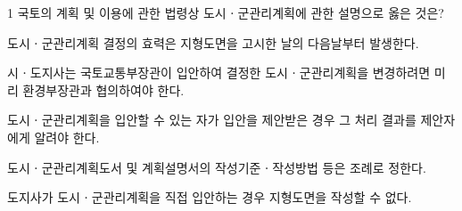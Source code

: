 \begin{question}{1}
국토의 계획 및 이용에 관한 법령상 도시ㆍ군관리계획에 관한 설명으로 옳은 것은?
\begin{choices}
  \item 도시ㆍ군관리계획 결정의 효력은 지형도면을 고시한 날의 다음날부터 발생한다.
  \item 시ㆍ도지사는 국토교통부장관이 입안하여 결정한 도시ㆍ군관리계획을 변경하려면 미리 환경부장관과 협의하여야 한다.
  \item 도시ㆍ군관리계획을 입안할 수 있는 자가 입안을 제안받은 경우 그 처리 결과를 제안자에게 알려야 한다.
  \item 도시ㆍ군관리계획도서 및 계획설명서의 작성기준ㆍ작성방법 등은 조례로 정한다.
  \item 도지사가 도시ㆍ군관리계획을 직접 입안하는 경우 지형도면을 작성할 수 없다.
\end{choices}
\end{question}
